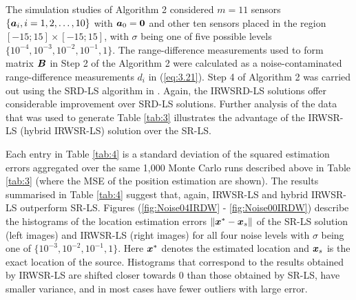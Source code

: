 The simulation studies of Algorithm 2 considered $m = 11$ sensors $\{\mbox{\boldmath$a$}_i, i=1, 2,\ldots,10\}$ with $\mbox{\boldmath$a$}_0=\mbox{\boldmath{$0$}}$ and other ten sensors placed in the region $[-15;15]\times[-15;15]$, with $\sigma$ being one of five possible levels $\{10^{-4}, 10^{-3}, 10^{-2}, 10^{-1}, 1\}$. The range-difference measurements used to form  matrix $\mbox{\boldmath$B$}$ in Step 2 of the Algorithm 2 were calculated as a noise-contaminated range-difference measurements $d_i$ in (\ref{eq:3.21}).%
Step 4 of Algorithm 2 was carried out using the SRD-LS algorithm in \cite{BeckStLi}. Again, the IRWSRD-LS solutions offer considerable improvement over SRD-LS solutions. Further analysis of the data that was used to generate Table \ref{tab:3} illustrates the advantage of the IRWSR-LS (hybrid IRWSR-LS) solution over the SR-LS.

Each entry in Table \ref{tab:4} is a standard deviation of the squared  estimation errors  aggregated over the  same 1,000 Monte Carlo runs described above in Table \ref{tab:3} (where the MSE of the position estimation are shown). The results summarised in Table \ref{tab:4} suggest that, again, IRWSR-LS and hybrid IRWSR-LS outperform SR-LS. Figures (\ref{fig:Noise04IRDW} - \ref{fig:Noise00IRDW}) describe the histograms of the location estimation errors $\|\mbox{\boldmath$x$}^* - \mbox{\boldmath$x$}_s\|$ of the SR-LS solution (left images) and IRWSR-LS (right images) for all four noise levels with $\sigma$ being one of $\{10^{-3}, 10^{-2}, 10^{-1}, 1\}$. Here $\mbox{\boldmath$x$}^*$ denotes the estimated location and $\mbox{\boldmath$x$}_s$ is the exact location of the source. Histograms that correspond to the results obtained by IRWSR-LS are shifted closer towards $0$ than those obtained by SR-LS, have smaller variance, and in most cases have fewer outliers with large error.



